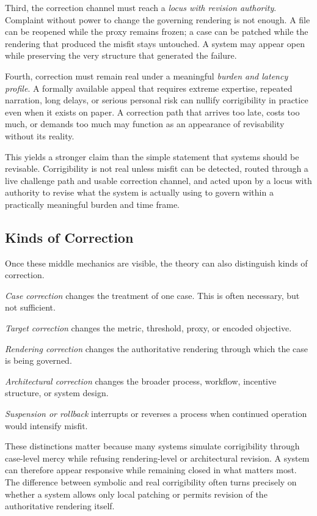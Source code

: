 \documentclass[11pt]{article}
\renewcommand{\emph}[1]{\textit{#1}}
\begin{document}
Third, the correction channel must reach a \emph{locus with revision authority}. Complaint without power to change the governing rendering is not enough. A file can be reopened while the proxy remains frozen; a case can be patched while the rendering that produced the misfit stays untouched. A system may appear open while preserving the very structure that generated the failure.

Fourth, correction must remain real under a meaningful \emph{burden and latency profile}. A formally available appeal that requires extreme expertise, repeated narration, long delays, or serious personal risk can nullify corrigibility in practice even when it exists on paper. A correction path that arrives too late, costs too much, or demands too much may function as an appearance of revisability without its reality.

This yields a stronger claim than the simple statement that systems should be revisable. Corrigibility is not real unless misfit can be detected, routed through a live challenge path and usable correction channel, and acted upon by a locus with authority to revise what the system is actually using to govern within a practically meaningful burden and time frame.

\subsection{Kinds of Correction}

Once these middle mechanics are visible, the theory can also distinguish kinds of correction.

\emph{Case correction} changes the treatment of one case. This is often necessary, but not sufficient.

\emph{Target correction} changes the metric, threshold, proxy, or encoded objective.

\emph{Rendering correction} changes the authoritative rendering through which the case is being governed.

\emph{Architectural correction} changes the broader process, workflow, incentive structure, or system design.

\emph{Suspension or rollback} interrupts or reverses a process when continued operation would intensify misfit.

These distinctions matter because many systems simulate corrigibility through case-level mercy while refusing rendering-level or architectural revision. A system can therefore appear responsive while remaining closed in what matters most. The difference between symbolic and real corrigibility often turns precisely on whether a system allows only local patching or permits revision of the authoritative rendering itself.
\end{document}
